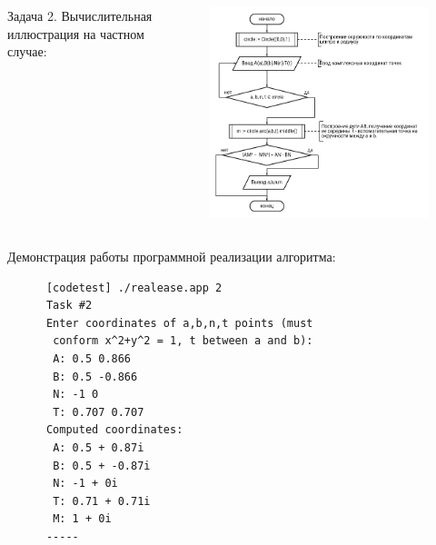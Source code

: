 \documentclass{beamer}
\begin{document}
\begin{frame}
   \begin{columns}
      \begin{column}{0.3\textwidth}
         \begin{block}{Задача 2. Вычислительная иллюстрация на частном случае:}
         \end{block}
      \end{column}
      \begin{column}{0.7\textwidth}
         \begin{figure}[h]
            \includegraphics[width=1\textwidth]{images/task2-diagram.png}
         \end{figure}
      \end{column}
   \end{columns}
\end{frame}

\begin{frame}[fragile]
   Демонстрация работы программной реализации алгоритма:
   \begin{verbatim}
      [codetest] ./realease.app 2
      Task #2
      Enter coordinates of a,b,n,t points (must
       conform x^2+y^2 = 1, t between a and b):
       A: 0.5 0.866
       B: 0.5 -0.866
       N: -1 0
       T: 0.707 0.707
      Computed coordinates:
       A: 0.5 + 0.87i
       B: 0.5 + -0.87i
       N: -1 + 0i
       T: 0.71 + 0.71i
       M: 1 + 0i
      -----
   \end{verbatim}
\end{frame}
\end{document}
